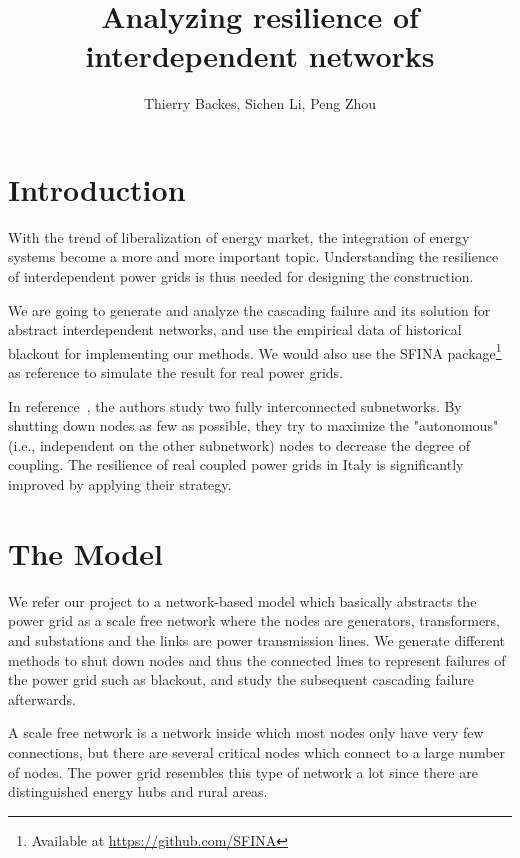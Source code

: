 \documentclass[11pt, a4paper]{article}
\begin{document}
\title{Analyzing resilience of interdependent networks}
\author{Thierry Backes, Sichen Li, Peng Zhou}
\date{}
\maketitle

\section{Introduction}

With the trend of liberalization of energy market, the integration of energy systems become a more and more important topic. Understanding the resilience of interdependent power grids is thus needed for designing the construction.

We are going to generate and analyze the cascading failure and its solution for abstract interdependent networks, and use the empirical data of historical blackout for implementing our methods. We would also use the SFINA package\footnote{Available at \url{https://github.com/SFINA}} as reference to simulate the result for real power grids.

In reference~\cite{schneider2013towards}, the authors study two fully interconnected subnetworks. By shutting down nodes as few as possible, they try to maximize the "autonomous" (i.e., independent on the other subnetwork) nodes to decrease the degree of coupling. The resilience of real coupled power grids in Italy is significantly improved by applying their strategy.

\section{The Model}

We refer our project to a network-based model which basically abstracts the power grid as a scale free network where the nodes are generators, transformers, and substations and the links are power transmission lines. We generate different methods to shut down nodes and thus the connected lines to represent failures of the power grid such as blackout, and study the subsequent cascading failure afterwards.

A scale free network is a network inside which most nodes only have very few connections, but there are several critical nodes which connect to a large number of nodes. The power grid resembles this type of network a lot since there are distinguished energy hubs and rural areas.
\end{document}
